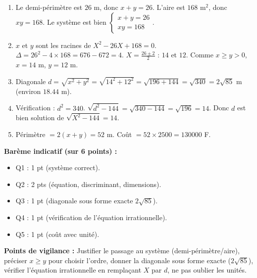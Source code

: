 \documentclass[11pt]{article}
\begin{document}
\begin{corrige}
\begin{enumerate}
\item Le demi-périmètre est $26$ m, donc $x+y=26$. L'aire est $168$ m$^2$, donc $xy=168$. Le système est bien $\begin{cases} x+y=26 \\ xy=168 \end{cases}$.
\item $x$ et $y$ sont les racines de $X^2-26X+168=0$. $\Delta = 26^2-4\times168 = 676-672=4$. $X=\frac{26\pm2}{2}$ : $14$ et $12$. Comme $x\ge y>0$, $x=14$ m, $y=12$ m.
\item Diagonale $d = \sqrt{x^2+y^2} = \sqrt{14^2+12^2} = \sqrt{196+144} = \sqrt{340} = 2\sqrt{85}$ m (environ $\num{18,44}$ m).
\item Vérification : $d^2 = 340$. $\sqrt{d^2-144} = \sqrt{340-144} = \sqrt{196} = 14$. Donc $d$ est bien solution de $\sqrt{X^2-144}=14$.
\item Périmètre $= 2(x+y)=52$ m. Coût $= 52 \times 2500 = \num{130000}$ F.
\end{enumerate}
\textbf{Barème indicatif (sur 6 points) :}
\begin{itemize}
\item Q1 : 1 pt (système correct).
\item Q2 : 2 pts (équation, discriminant, dimensions).
\item Q3 : 1 pt (diagonale sous forme exacte $2\sqrt{85}$).
\item Q4 : 1 pt (vérification de l'équation irrationnelle).
\item Q5 : 1 pt (coût avec unité).
\end{itemize}
\textbf{Points de vigilance :} Justifier le passage au système (demi-périmètre/aire), préciser $x\ge y$ pour choisir l'ordre, donner la diagonale sous forme exacte ($2\sqrt{85}$), vérifier l'équation irrationnelle en remplaçant $X$ par $d$, ne pas oublier les unités.
\end{corrige}
\end{document}
